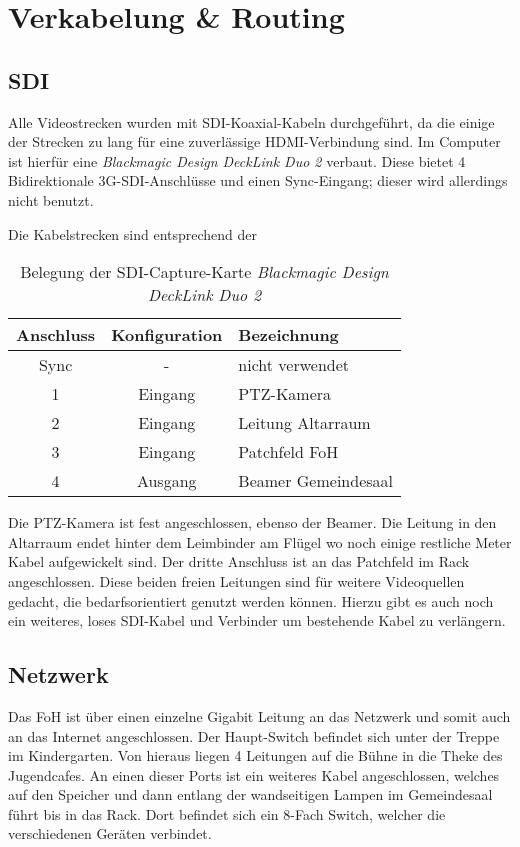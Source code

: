 \chapter{Verkabelung \& Routing}
	\section{SDI}
		Alle Videostrecken wurden mit \Gls{SDI}-Koaxial-Kabeln durchgeführt, da die einige der Strecken zu lang für eine zuverlässige HDMI-Verbindung sind.
		Im Computer ist hierfür eine \textit{Blackmagic Design DeckLink Duo 2} verbaut.
		Diese bietet 4 Bidirektionale 3G-\Gls{SDI}-Anschlüsse und einen Sync-Eingang; dieser wird allerdings nicht benutzt.

		Die Kabelstrecken sind entsprechend der 
		\begin{table}[h]
			\caption{Belegung der \Gls{SDI}-Capture-Karte \textit{Blackmagic Design DeckLink Duo 2}}
			\label{table:kabel:sdi:decklink}
			\centering
			
			\begin{tabular}{ccl}
				\toprule
				Anschluss & Konfiguration & Bezeichnung \\
				\midrule
				Sync & - & nicht verwendet \\
				1 & Eingang & \Gls{PTZ-Kamera} \\
				2 & Eingang & Leitung Altarraum \\
				3 & Eingang & Patchfeld \Gls{FoH} \\
				4 & Ausgang & Beamer Gemeindesaal \\
				\bottomrule
			\end{tabular}
		\end{table}

		Die PTZ-Kamera ist fest angeschlossen, ebenso der Beamer.
		Die Leitung in den Altarraum endet hinter dem Leimbinder am Flügel wo noch einige restliche Meter Kabel aufgewickelt sind.
		Der dritte Anschluss ist an das Patchfeld im Rack angeschlossen.
		Diese beiden freien Leitungen sind für weitere Videoquellen gedacht, die bedarfsorientiert genutzt werden können.
		Hierzu gibt es auch noch ein weiteres, loses \Gls{SDI}-Kabel und Verbinder um bestehende Kabel zu verlängern.

	\section{Netzwerk}
		Das \Gls{FoH} ist über einen einzelne Gigabit Leitung an das Netzwerk und somit auch an das Internet angeschlossen.
		Der Haupt-Switch befindet sich unter der Treppe im Kindergarten.
		Von hieraus liegen 4 Leitungen auf die Bühne in die Theke des Jugendcafes.
		An einen dieser Ports ist ein weiteres Kabel angeschlossen, welches auf den Speicher und dann entlang der wandseitigen Lampen im Gemeindesaal führt bis in das Rack.
		Dort befindet sich ein 8-Fach Switch, welcher die verschiedenen Geräten verbindet.

